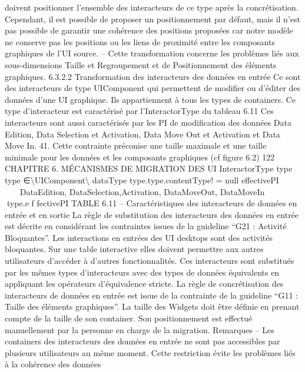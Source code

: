 \documentclass{article}
\begin{document}
doivent positionner l’ensemble des interacteurs de ce type apr\`{e}s la concr\'{e}tisation. Cependant, il
est possible de proposer un positionnement par d\'{e}faut, mais il n’est pas possible de garantir une
coh\'{e}rence des positions propos\'{e}es car notre mod\`{e}le ne conserve pas les positions ou les liens
de proximit\'{e} entre les composants graphiques de l’UI source.
– Cette transformation concerne les probl\`{e}mes li\'{e}s aux sous-dimensions Taille et Regroupement
et de Positionnement des \'{e}l\'{e}ments graphiques.
6.3.2.2
Transformation des interacteurs des donn\'{e}es en entr\'{e}e
Ce sont des interacteurs de type UIComponent qui permettent de modiﬁer ou d’\'{e}diter des donn\'{e}es d’une UI graphique. Ils appartiennent \`{a} tous les types de containers. Ce type d’interacteur est
caract\'{e}ris\'{e} par l’InteractorType du tableau 6.11
Ces interacteurs sont aussi caract\'{e}ris\'{e}s par les PI de modiﬁcation des donn\'{e}es Data Edition, Data
Selection et Activation, Data Move Out et Activation et Data Move In.
41. Cette contrainte pr\'{e}conise une taille maximale et une taille minimale pour les donn\'{e}es et les composants graphiques
(cf ﬁgure 6.2)
122
CHAPITRE 6. MÉCANISMES DE MIGRATION DES UI
InteractorType
type
type ∈\textbackslash{}{UIComponent\textbackslash{}}
dataType
type.type.contentType! = null
effectivePI







DataEdition,
DataSelection,Activation,
DataMoveOut,
DataMoveIn







⊂type.e f fectivePI
TABLE 6.11 – Caract\'{e}ristiques des interacteurs de donn\'{e}es en entr\'{e}e et en sortie
La r\`{e}gle de substitution des interacteurs des donn\'{e}es en entr\'{e}e
est d\'{e}crite en consid\'{e}rant les
contraintes issues de la guideline “G21 : Activit\'{e} Bloquantes”. Les interactions en entr\'{e}es des UI
desktops sont des activit\'{e}s bloquantes. Sur une table interactive elles doivent permettre aux autres
utilisateurs d’acc\'{e}der \`{a} d’autres fonctionnalit\'{e}s.
Ces interacteurs sont substitu\'{e}s par les m\^{e}mes types d’interacteurs avec des types de donn\'{e}es
\'{e}quivalents en appliquant les op\'{e}rateurs d’\'{e}quivalence stricte.
La r\`{e}gle de concr\'{e}tisation des interacteurs de donn\'{e}es en entr\'{e}e
est issue de la contrainte de la
guideline “G11 : Taille des \'{e}l\'{e}ments graphiques”. La taille des Widgets doit \^{e}tre d\'{e}ﬁnie en prenant
compte de la taille de son container. Son positionnement est effectu\'{e} manuellement par la personne
en charge de la migration.
Remarques
– Les containers des interacteurs des donn\'{e}es en entr\'{e}e ne sont pas accessibles par plusieurs utilisateurs au m\^{e}me moment. Cette restriction \'{e}vite les probl\`{e}mes li\'{e}s \`{a} la coh\'{e}rence des donn\'{e}es
\end{document}
